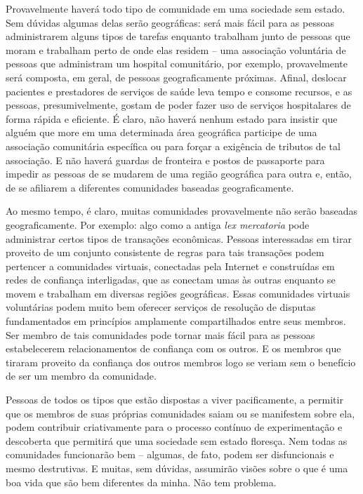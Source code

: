 Provavelmente haverá todo tipo de comunidade em uma sociedade sem estado. Sem dúvidas algumas delas serão geográficas: será mais fácil para as pessoas administrarem alguns tipos de tarefas enquanto trabalham junto de pessoas que moram e trabalham perto de onde elas residem -- uma associação voluntária de pessoas que administram um hospital comunitário, por exemplo, provavelmente será composta, em geral, de pessoas geograficamente próximas. Afinal, deslocar pacientes e prestadores de serviços de saúde leva tempo e consome recursos, e as pessoas, presumivelmente, gostam de poder fazer uso de serviços hospitalares de forma rápida e eficiente. É claro, não haverá nenhum estado para insistir que alguém que more em uma determinada área geográfica participe de uma associação comunitária específica ou para forçar a exigência de tributos de tal associação. E não haverá guardas de fronteira e postos de passaporte para impedir as pessoas de se mudarem de uma região geográfica para outra e, então, de se afiliarem a diferentes comunidades baseadas geograficamente.

Ao mesmo tempo, é claro, muitas comunidades provavelmente não serão baseadas geograficamente. Por exemplo: algo como a antiga \emph{lex mercatoria} pode administrar certos tipos de transações econômicas. Pessoas interessadas em tirar proveito de um conjunto consistente de regras para tais transações podem pertencer a comunidades virtuais, conectadas pela Internet e construídas em redes de confiança interligadas, que as conectam umas às outras enquanto se movem e trabalham em diversas regiões geográficas. Essas comunidades virtuais voluntárias podem muito bem oferecer serviços de resolução de disputas fundamentados em princípios amplamente compartilhados entre seus membros. Ser membro de tais comunidades pode tornar mais fácil para as pessoas estabelecerem relacionamentos de confiança com os outros. E os membros que tiraram proveito da confiança dos outros membros logo se veriam sem o benefício de ser um membro da comunidade.

Pessoas de todos os tipos que estão dispostas a viver pacificamente, a permitir que os membros de suas próprias comunidades saiam ou se manifestem sobre ela, podem contribuir criativamente para o processo contínuo de experimentação e descoberta que permitirá que uma sociedade sem estado floresça. Nem todas as comunidades funcionarão bem -- algumas, de fato, podem ser disfuncionais e mesmo destrutivas. E muitas, sem dúvidas, assumirão visões sobre o que é uma boa vida que são bem diferentes da minha. Não tem problema. 


